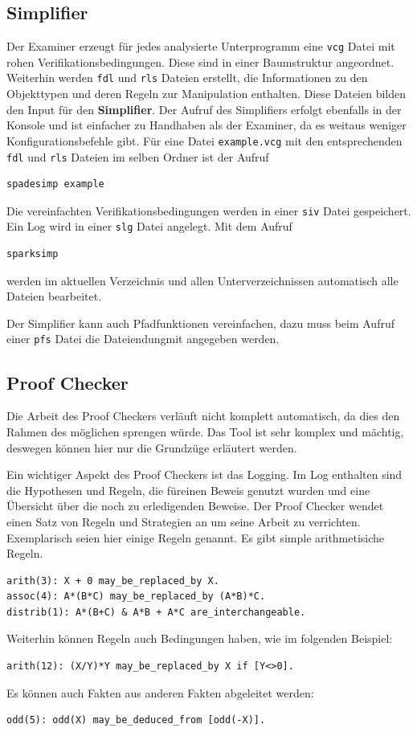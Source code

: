 \subsection{Simplifier}
Der Examiner erzeugt für jedes analysierte Unterprogramm eine \texttt{vcg} Datei mit rohen Verifikationsbedingungen. Diese sind in einer Baumstruktur angeordnet. Weiterhin werden \texttt{fdl} und \texttt{rls} Dateien erstellt, die Informationen zu den Objekttypen und deren Regeln zur Manipulation enthalten. Diese Dateien bilden den Input für den \textbf{Simplifier}.
Der Aufruf des Simplifiers erfolgt ebenfalls in der Konsole und ist einfacher zu Handhaben als der Examiner, da es weitaus weniger Konfigurationsbefehle gibt. Für eine Datei \texttt{example.vcg} mit den entsprechenden \texttt{fdl} und \texttt{rls} Dateien im selben Ordner ist der Aufruf

\begin{verbatim}
spadesimp example
\end{verbatim}

Die vereinfachten Verifikationsbedingungen werden in einer \texttt{siv} Datei gespeichert. Ein Log wird in einer \texttt{slg} Datei angelegt.
Mit dem Aufruf
\begin{verbatim}
sparksimp
\end{verbatim}
werden im aktuellen Verzeichnis und allen Unterverzeichnissen automatisch alle Dateien bearbeitet.

Der Simplifier kann auch Pfadfunktionen vereinfachen, dazu muss beim Aufruf einer \texttt{pfs} Datei die Dateiendungmit angegeben werden. 

\subsection{Proof Checker}
Die Arbeit des Proof Checkers verläuft nicht komplett automatisch, da dies den Rahmen des möglichen sprengen würde. Das Tool ist sehr komplex und mächtig, deswegen können hier nur die Grundzüge erläutert werden.

Ein wichtiger Aspekt des Proof Checkers ist das Logging. Im Log enthalten sind die Hypothesen und Regeln, die füreinen Beweis genutzt wurden und eine Übersicht über die noch zu erledigenden Beweise.
Der Proof Checker wendet einen Satz von Regeln und Strategien an um seine Arbeit zu verrichten. Exemplarisch seien hier einige Regeln genannt. Es gibt simple arithmetisiche Regeln.
\begin{verbatim}
arith(3): X + 0 may_be_replaced_by X.
assoc(4): A*(B*C) may_be_replaced_by (A*B)*C.
distrib(1): A*(B+C) & A*B + A*C are_interchangeable.
\end{verbatim} 
Weiterhin können Regeln auch Bedingungen haben, wie im folgenden Beispiel:
\begin{verbatim}
arith(12): (X/Y)*Y may_be_replaced_by X if [Y<>0].
\end{verbatim}
Es können auch Fakten aus anderen Fakten abgeleitet werden:
\begin{verbatim}
odd(5): odd(X) may_be_deduced_from [odd(-X)].
\end{verbatim}

